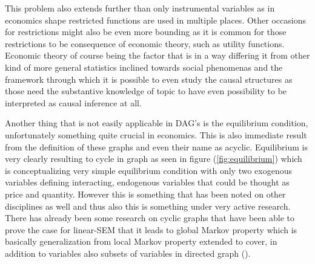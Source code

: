 \documentclass[main=english,12pt,a4paper,pdftex,econ,utf8]{aaltothesis}
\begin{document}
This problem also extends further than only instrumental variables as in economics shape restricted functions are used in multiple places. Other occasions for restrictions might also be even more bounding as it is common for those restrictions to be consequence of economic theory, such as utility functions. Economic theory of course being the factor that is in a way differing it from other kind of more general statistics inclined towards social phenomenas and the framework through which it is possible to even study the causal structures as those need the substantive knowledge of topic to have even possibility to be interpreted as causal inference at all. 



Another thing that is not easily applicable in DAG's is the equilibrium condition, unfortunately something quite crucial in economics. This is also immediate result from the definition of these graphs and even their name as acyclic. Equilibrium is very clearly resulting to cycle in graph as seen in figure (\ref{fig:equilibrium}) which is conceptualizing very simple equilibrium condition with only two exogenous variables defining interacting, endogenous variables that could be thought as price and quantity. However this is something that has been noted on other disciplines as well and thus also this is something under very active research. There has already been some research on cyclic graphs that have been able to prove the case for linear-SEM that it leads to global Markov property which is basically generalization from local Markov property extended to cover, in addition to variables also subsets of variables in directed graph (\cite{PeterSpirtes1994}).
\end{document}
